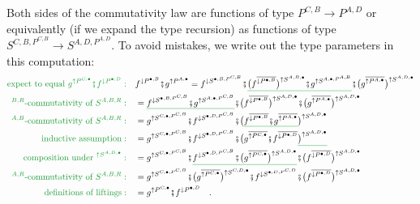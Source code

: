 Both sides of the commutativity law are functions of type $P^{C,B}\rightarrow P^{A,D}$
or equivalently (if we expand the type recursion) as functions of
type $S^{C,B,P^{C,B}}\rightarrow S^{A,D,P^{A,D}}$. To avoid mistakes,
we write out the type parameters in this computation:
\begin{align*}
{\color{greenunder}\text{expect to equal }g^{\uparrow P^{C,\bullet}}\bef f^{\downarrow P^{\bullet,D}}:}\quad & f^{\downarrow P^{\bullet,B}}\bef g^{\uparrow P^{A,\bullet}}=f^{\downarrow S^{\bullet,B,P^{C,B}}}\bef\gunderline{\big(f^{\overline{\downarrow P^{\bullet,B}}}\big)^{\uparrow S^{A,B,\bullet}}\bef g^{\uparrow S^{A,\bullet,P^{A,B}}}}\bef\big(g^{\overline{\uparrow P^{A,\bullet}}}\big)^{\uparrow S^{A,D,\bullet}}\\
{\color{greenunder}^{B,R}\text{-commutativity of }S^{A,B,R}:}\quad & =\gunderline{f^{\downarrow S^{\bullet,B,P^{C,B}}}\bef g^{\uparrow S^{A,\bullet,P^{C,B}}}}\bef\big(f^{\overline{\downarrow P^{\bullet,B}}}\big)^{\uparrow S^{A,D,\bullet}}\bef\big(g^{\overline{\uparrow P^{A,\bullet}}}\big)^{\uparrow S^{A,D,\bullet}}\\
{\color{greenunder}^{A,B}\text{-commutativity of }S^{A,B,R}:}\quad & =g^{\uparrow S^{C,\bullet,P^{C,B}}}\bef f^{\downarrow S^{\bullet,D,P^{C,B}}}\bef\big(\gunderline{f^{\overline{\downarrow P^{\bullet,B}}}\bef g^{\overline{\uparrow P^{A,\bullet}}}}\big)^{\uparrow S^{A,D,\bullet}}\\
{\color{greenunder}\text{inductive assumption}:}\quad & =g^{\uparrow S^{C,\bullet,P^{C,B}}}\bef f^{\downarrow S^{\bullet,D,P^{C,B}}}\bef\big(g^{\overline{\uparrow P^{C,\bullet}}}\bef f^{\overline{\downarrow P^{\bullet,D}}}\gunderline{\big)^{\uparrow S^{A,D,\bullet}}}\\
{\color{greenunder}\text{composition under }^{\uparrow S^{A,D,\bullet}}:}\quad & =g^{\uparrow S^{C,\bullet,P^{C,B}}}\bef\gunderline{f^{\downarrow S^{\bullet,D,P^{C,B}}}\bef\big(g^{\overline{\uparrow P^{C,\bullet}}}\big)^{\uparrow S^{A,D,\bullet}}}\bef\big(f^{\overline{\downarrow P^{\bullet,D}}}\big)^{\uparrow S^{A,D,\bullet}}\\
{\color{greenunder}^{A,R}\text{-commutativity of }S^{A,B,R}:}\quad & =g^{\uparrow S^{C,\bullet,P^{C,B}}}\bef\big(g^{\overline{\uparrow P^{C,\bullet}}}\big)^{\uparrow S^{C,D,\bullet}}\bef f^{\downarrow S^{\bullet,D,P^{C,D}}}\bef\big(f^{\overline{\downarrow P^{\bullet,D}}}\big)^{\uparrow S^{A,D,\bullet}}\\
{\color{greenunder}\text{definitions of liftings}:}\quad & =g^{\uparrow P^{C,\bullet}}\bef f^{\downarrow P^{\bullet,D}}\quad.
\end{align*}

